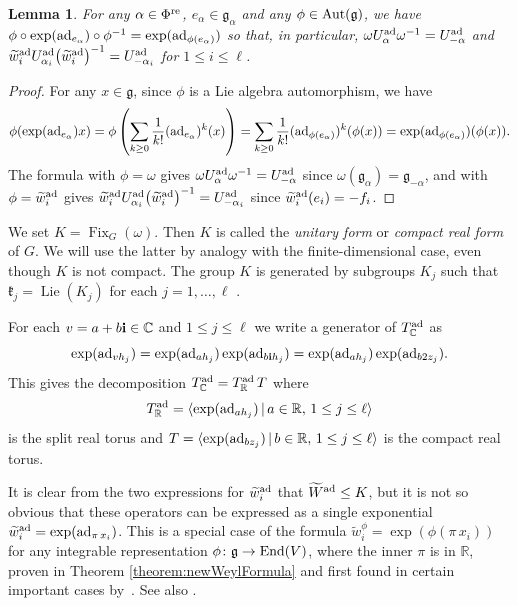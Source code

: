 \documentclass[pdftex]{sigma}
\numberwithin{equation}{section}
\newtheorem{Lemma}[Theorem]{Lemma}
\def\C{{\mathbb C}}
\def\R{\mathbb{R}}
\def\a{\alpha}
\def\roots{{\Phi}}
\def\wtil{\widetilde w}
\def\Wtil{\widetilde W}
\def\la{\langle}
\def\ra{\rangle}
\def\bi{{\bf i}}
\def\fg{\mathfrak{g}}
\def\k{\mathfrak{k}}
\begin{document}
\begin{Lemma}\label{lemma:auto_action_on_real_root_groups}
For any $\a\in\roots^{\rm re}$, $e_\a\in\fg_\a$ and any $\phi\in {\rm Aut}(\fg)$, we have
$\phi\circ \exp({\rm ad}_{e_\a}) \circ\phi^{-1} = \exp({\rm ad}_{\phi(e_\a)})$ so that, in particular,
$\omega U^{\rm ad}_\a \omega^{-1} = U^{\rm ad}_{-\a}$ and $\wtil^{\rm ad}_i U^{\rm ad}_{\a_i} \big(\wtil^{\rm ad}_i\big)^{-1} = U^{\rm ad}_{-\a_i}$ for $1\leq i\leq\ell$.
\end{Lemma}

\begin{proof}For any $x\in\fg$, since $\phi$ is a Lie algebra automorphism, we have
\[\phi(\exp({\rm ad}_{e_\a})x) = \phi\left( \sum_{k\geq 0} \frac{1}{k!} ({\rm ad}_{e_\a})^k (x) \right)
= \sum_{k\geq 0} \frac{1}{k!} ({\rm ad}_{\phi(e_\a)})^k (\phi(x)) = \exp({\rm ad}_{\phi(e_\a)}) (\phi(x)).\]
The formula with $\phi = \omega$ gives $\omega U^{\rm ad}_\a \omega^{-1} = U^{\rm ad}_{-\a}$ since $\omega(\fg_\a) = \fg_{-\a}$, and with $\phi = \wtil^{\rm ad}_i$ gives $\wtil^{\rm ad}_i U^{\rm ad}_{\a_i} \big(\wtil^{\rm ad}_i\big)^{-1} = U^{\rm ad}_{-\a_i}$ since $\wtil^{\rm ad}_i(e_i) = -f_i$.
\end{proof}

We set $K=\operatorname{Fix}_G(\omega)$. Then $K$ is called the {\it unitary form} or {\it compact real form} of $G$. We will use the latter by analogy with the finite-dimensional case, even though $K$ is not compact. The group $K$ is generated by subgroups $K_j$ such that $\k_j = \operatorname{Lie}(K_j)$ for each $j=1,\dots ,\ell$ \cite{Caprace09, KacPeterson85c, Tits86b}.

For each $v = a + b\bi\in\C$ and $1\leq j\leq\ell$ we write a generator of $T_\C^{\rm ad}$ as
\[\exp({\rm ad}_{vh_j}) = \exp({\rm ad}_{ah_j}) \exp({\rm ad}_{b\bi h_j}) = \exp({\rm ad}_{ah_j}) \exp({\rm ad}_{b2 z_j}).\]
This gives the decomposition $T_\C^{\rm ad} = T_\R^{\rm ad}\, T$ where
\begin{equation}\label{equation:split_real_torus}
T_\R^{\rm ad} = \la \exp({\rm ad}_{ah_j}) \, |\, a\in\R,\, 1\leq j\leq\ell\ra
\end{equation}
is the split real torus and $T = \la \exp({\rm ad}_{b z_j}) \, |\, b\in\R, \, 1\leq j\leq\ell\ra$ is the compact real torus.

It is clear from the two expressions for $\wtil^{\rm ad}_i$ that $\Wtil^{\rm ad}\leq K$, but it is not so obvious that these operators can be expressed as
a single exponential $\wtil^{\rm ad}_i = \exp({\rm ad}_{\pi\, x_i})$. This is a special case of the formula $\wtil^{\phi}_i = \exp(\phi(\pi\, x_i))$ for any
integrable representation $\phi\colon \fg\to {\rm End}(V)$, where the inner $\pi$ is in $\R$, proven in Theorem \ref{theorem:newWeylFormula}
and first found in certain important cases by~\cite{DamourHillmann09}.
See also \cite{HainkeKoehlLevy15,KleinschmidtNicolai13}.
\end{document}
